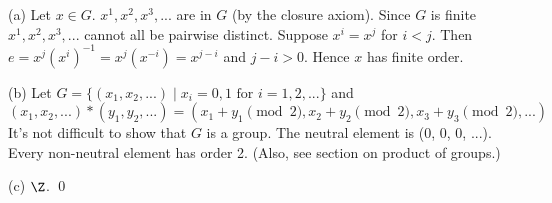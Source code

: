 
  \proof
  (a)
  Let $x \in G$.
  $x^1, x^2, x^3, ...$ are in $G$ (by the closure axiom).
  Since $G$ is finite $x^1, x^2, x^3, ...$ cannot all be pairwise distinct. 
  Suppose $x^i = x^j$ for $i < j$.
  Then $e = x^j (x^{i})^{-1} = x^{j} (x^{-i}) = x^{j - i}$ and $j - i > 0$.
  Hence $x$ has finite order.


  (b)
  Let $G = \{(x_1, x_2, ...) \mid x_i = 0, 1 \text{ for } i = 1, 2, ...\}$
  and
  \[
  (x_1, x_2, ...) * (y_1, y_2, ...)
  =
  (
  x_1 + y_1 \pmod{2},
  x_2 + y_2 \pmod{2},
  x_3 + y_3 \pmod{2},
  ...)
  \]
  It's not difficult to show that $G$ is a group.
  The neutral element is (0, 0, 0, ...).
  Every non-neutral element has order 2.
  (Also, see section on product of groups.)
  
  (c) $\Z$.     
  \qed
